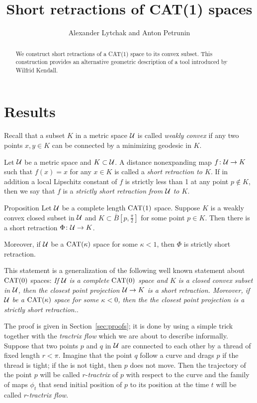\documentclass[oneside,a4paper, 12pt]{article}
\begin{document}
\title{Short retractions of CAT(1) spaces}
\author{Alexander Lytchak and Anton Petrunin}
\date{}
\maketitle

\begin{abstract}
We construct short retractions of a CAT(1) space to its convex subset.
This construction provides an alternative geometric description of a tool introduced by Wilfrid Kendall.
\end{abstract}


\section{Results}

Recall that a  subset $K$ in a metric space ${\mathcal{U}}$ is called \emph{weakly convex} if any two points $x,y\in K$ can be connected by a minimizing geodesic in $K$.

Let ${\mathcal{U}}$ be a metric space and $K\subset {\mathcal{U}}$.
A distance nonexpanding map $f\colon{\mathcal{U}}\to K$ such that $f(x)=x$ for any $x\in K$ is called a \emph{short retraction to $K$}.
If in addition a local Lipschitz constant of $f$ is strictly less than 1 at any point $p\notin K$, 
then we say that $f$ is a \emph{strictly short retraction from ${\mathcal{U}}$ to $K$}.  

\begin{thm}{Proposition}\label{thm:retraction:Phi}
Let $\mathcal{U}$ be a complete length $\mathrm{CAT}(1)$ space.
 Suppose $K$ is a weakly convex closed subset in $\mathcal{U}$ and $K\subset \bar B[p,\tfrac\pi2]$ for some point $p\in K$.
Then there is a short retraction 
$\Phi\colon\mathcal{U}\to K$.

Moreover, if $\mathcal{U}$ be a $\mathrm{CAT}(\kappa)$ space for some $\kappa<1$, then $\Phi$ is strictly short retraction.
\end{thm}

This statement is a generalization of the following well known statement about $\mathrm{CAT}(0)$ spaces:
\emph{If ${\mathcal{U}}$ is a complete $\mathrm{CAT}(0)$ space and $K$ is a closed convex subset in ${\mathcal{U}}$,
then the closest point projection ${\mathcal{U}}\to K$ is a short retraction. Moreover, if $\mathcal{U}$ be a $\mathrm{CAT}(\kappa)$ space for some $\kappa<0$, then the the closest point projection is a strictly short  retraction.}.


The proof is given in Section~\ref{sec:proofs};
it is done by using a simple trick together with the \emph{tractrix flow} which we are about to describe informally.
Suppose that two points $p$ and $q$ in ${\mathcal{U}}$ are connected to each other by a thread of fixed length $r<\pi$.
Imagine that the point $q$ follow a curve and drags $p$ if the thread is tight; 
if the is not tight, then $p$ does not move.
Then the trajectory of the point $p$ will be called $r$-\emph{tractrix} of $p$ with respect to the curve
and the family of maps $\phi_t$ that send initial position of $p$ to its position at the time $t$ will be called $r$-\emph{tractrix flow}.
\end{document}
